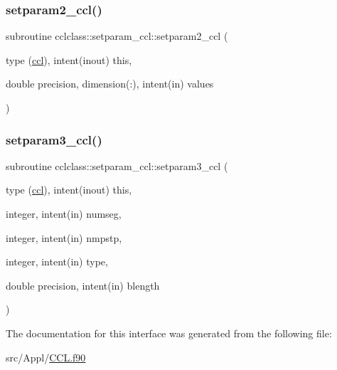 \mbox{\label{interfacecclclass_1_1setparam__ccl_a7221337eb59d3a666420ae8fc1878f9d}} 
\subsubsection{\texorpdfstring{setparam2\_ccl()}{setparam2\_ccl()}}
{\footnotesize\ttfamily subroutine cclclass\+::setparam\+\_\+ccl\+::setparam2\+\_\+ccl (\begin{DoxyParamCaption}\item[{type (\mbox{\hyperlink{namespacecclclass_structcclclass_1_1ccl}{ccl}}), intent(inout)}]{this,  }\item[{double precision, dimension(\+:), intent(in)}]{values }\end{DoxyParamCaption})}

\mbox{\label{interfacecclclass_1_1setparam__ccl_a3cee72fa39bab552f147f7adb9ea942e}} 
\subsubsection{\texorpdfstring{setparam3\_ccl()}{setparam3\_ccl()}}
{\footnotesize\ttfamily subroutine cclclass\+::setparam\+\_\+ccl\+::setparam3\+\_\+ccl (\begin{DoxyParamCaption}\item[{type (\mbox{\hyperlink{namespacecclclass_structcclclass_1_1ccl}{ccl}}), intent(inout)}]{this,  }\item[{integer, intent(in)}]{numseg,  }\item[{integer, intent(in)}]{nmpstp,  }\item[{integer, intent(in)}]{type,  }\item[{double precision, intent(in)}]{blength }\end{DoxyParamCaption})}



The documentation for this interface was generated from the following file\+:\begin{DoxyCompactItemize}
\item 
src/\+Appl/\mbox{\hyperlink{_c_c_l_8f90}{C\+C\+L.\+f90}}\end{DoxyCompactItemize}
